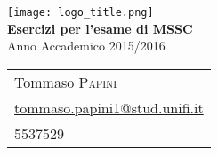 \begin{center}
   	\texttt{[image: logo\_title.png]}\\[0.8cm]
	{\huge\bfseries Esercizi per l'esame di MSSC}\\
	Anno Accademico 2015/2016\\[0.8cm]

	\begin{tabular*}{\linewidth}{l}
		Tommaso \textsc{Papini}\\
		\href{mailto:tommaso.papini1@stud.unifi.it}{tommaso.papini1@stud.unifi.it}\\
		5537529
	\end{tabular*}\\[1.2cm]
\end{center}
